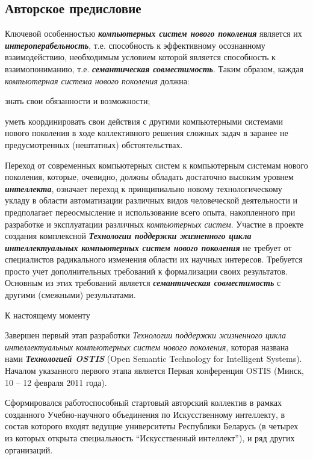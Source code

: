 \begin{partbacktext}
\part*{Авторское предисловие}
\label{chap_preface_auth}

Ключевой особенностью \textbf{\textit{компьютерных систем нового поколения}} является их \textbf{\textit{интероперабельность}}, т.е. способность к эффективному осознанному взаимодействию, необходимым условием которой является способность к взаимопониманию, т.е. \textbf{\textit{семантическая совместимость}}. Таким образом, каждая \textit{компьютерная система нового поколения} должна:

\begin{textitemize}
	\item знать свои обязанности и возможности;
	\item уметь координировать свои действия с другими компьютерными системами нового поколения в ходе коллективного решения сложных задач в заранее не предусмотренных (нештатных) обстоятельствах.
\end{textitemize}

Переход от современных компьютерных систем к компьютерным системам нового поколения, которые, очевидно, должны обладать достаточно высоким уровнем \textbf{\textit{интеллекта}}, означает переход к принципиально новому технологическому укладу в области автоматизации различных видов человеческой деятельности и предполагает переосмысление и использование всего опыта, накопленного при разработке и эксплуатации различных \textit{компьютерных систем}. Участие в проекте создания комплексной \textbf{\textit{Технологии поддержки жизненного цикла интеллектуальных компьютерных систем нового поколения}} не требует от специалистов радикального изменения области их научных интересов. Требуется просто учет дополнительных требований к формализации своих результатов. Основным из этих требований является \textbf{\textit{семантическая совместимость}} с другими (смежными) результатами.

К настоящему моменту 
\begin{textitemize}
	\item Завершен первый этап разработки \textit{Технологии поддержки жизненного цикла интеллектуальных компьютерных систем нового поколения}, которая названа нами \textbf{\textit{Технологией OSTIS}} (Open Semantic Technology for Intelligent Systems). Началом указанного первого этапа является Первая конференция OSTIS (Минск, 10 -- 12 февраля 2011 года).
	\item Сформировался работоспособный стартовый авторский коллектив в рамках созданного Учебно-научного объединения по Искусственному интеллекту, в состав которого входят ведущие университеты Республики Беларусь (в четырех из которых открыта специальность ``Искусственный интеллект''), и ряд других организаций.
\end{textitemize}



\end{partbacktext}
